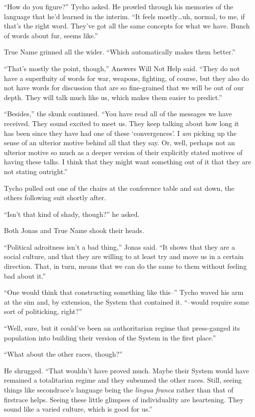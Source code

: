 ``How do you figure?'' Tycho asked. He prowled through his memories of the language that he'd learned in the interim. ``It feels mostly\ldots uh, normal, to me, if that's the right word. They've got all the same concepts for what we have. Bunch of words about fur, seems like.''

True Name grinned all the wider. ``Which automatically makes them better.''

``That's mostly the point, though,'' Answers Will Not Help said. ``They do not have a superfluity of words for war, weapons, fighting, of course, but they also do not have words for discussion that are so fine-grained that we will be out of our depth. They will talk much like us, which makes them easier to predict.''

``Besides,'' the skunk continued. ``You have read all of the messages we have received. They sound excited to meet us. They keep talking about how long it has been since they have had one of these `convergences'. I \emph{am} picking up the sense of an ulterior motive behind all that they say. Or, well, perhaps not an ulterior motive so much as a deeper version of their explicitly stated motives of having these talks. I think that they might want something out of it that they are not stating outright.''

Tycho pulled out one of the chairs at the conference table and sat down, the others following suit shortly after.

``Isn't that kind of shady, though?'' he asked.

Both Jonas and True Name shook their heads.

``Political adroitness isn't a bad thing,'' Jonas said. ``It shows that they are a social culture, and that they are willing to at least try and move us in a certain direction. That, in turn, means that we can do the same to them without feeling bad about it.''

``One would think that constructing something like this--'' Tycho waved his arm at the sim and, by extension, the System that contained it. ``--would require some sort of politicking, right?''

``Well, sure, but it could've been an authoritarian regime that press-ganged its population into building their version of the System in the first place.''

``What about the other races, though?''

He shrugged. ``That wouldn't have proved much. Maybe their System would have remained a totalitarian regime and they subsumed the other races. Still, seeing things like secondrace's language being the \emph{lingua franca} rather than that of firstrace helps. Seeing these little glimpses of individuality are heartening. They sound like a varied culture, which is good for us.''

